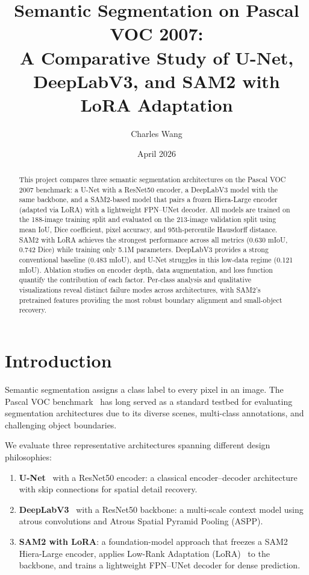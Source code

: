 \documentclass[11pt]{article}
\title{Semantic Segmentation on Pascal VOC 2007:\\A Comparative Study of U-Net, DeepLabV3, and SAM2 with LoRA Adaptation}
\author{Charles Wang}
\date{April 2026}
\begin{document}
\maketitle

\begin{abstract}
This project compares three semantic segmentation architectures on the Pascal VOC 2007 benchmark: a U-Net with a ResNet50 encoder, a DeepLabV3 model with the same backbone, and a SAM2-based model that pairs a frozen Hiera-Large encoder (adapted via LoRA) with a lightweight FPN--UNet decoder. All models are trained on the 188-image training split and evaluated on the 213-image validation split using mean IoU, Dice coefficient, pixel accuracy, and 95th-percentile Hausdorff distance. SAM2 with LoRA achieves the strongest performance across all metrics (0.630 mIoU, 0.742 Dice) while training only 5.1M parameters. DeepLabV3 provides a strong conventional baseline (0.483 mIoU), and U-Net struggles in this low-data regime (0.121 mIoU). Ablation studies on encoder depth, data augmentation, and loss function quantify the contribution of each factor. Per-class analysis and qualitative visualizations reveal distinct failure modes across architectures, with SAM2's pretrained features providing the most robust boundary alignment and small-object recovery.
\end{abstract}

\section{Introduction}

Semantic segmentation assigns a class label to every pixel in an image. The Pascal VOC benchmark~\cite{everingham2010pascal} has long served as a standard testbed for evaluating segmentation architectures due to its diverse scenes, multi-class annotations, and challenging object boundaries.

We evaluate three representative architectures spanning different design philosophies:
\begin{enumerate}
    \item \textbf{U-Net}~\cite{ronneberger2015unet} with a ResNet50 encoder: a classical encoder--decoder architecture with skip connections for spatial detail recovery.
    \item \textbf{DeepLabV3}~\cite{chen2017rethinking} with a ResNet50 backbone: a multi-scale context model using atrous convolutions and Atrous Spatial Pyramid Pooling (ASPP).
    \item \textbf{SAM2 with LoRA}: a foundation-model approach that freezes a SAM2 Hiera-Large encoder, applies Low-Rank Adaptation (LoRA)~\cite{hu2022lora} to the backbone, and trains a lightweight FPN--UNet decoder for dense prediction.
\end{enumerate}
\end{document}
